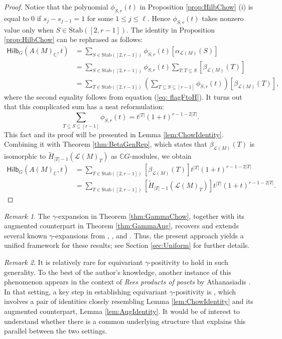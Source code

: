 \documentclass[reqno]{amsart}
\newcommand{\Stab}{{\mathrm{Stab}}}
\renewcommand{\L}{{\mathcal{L}}}
\newcommand{\Hilb}{{\mathsf{Hilb}}}
\theoremstyle{definition}
\theoremstyle{remark}
\newtheorem{rem}{Remark}[section]
\begin{document}
\begin{proof}
Notice that the polynomial $\phi_{S,r}(t)$ in Proposition \ref{prop:HilbChow} (i) is equal to $0$ if $s_j-s_{j-1}=1$ for some $1\le j\le \ell$.
Hence $\phi_{S,r}(t)$ takes nonzero value only when $S\in\Stab([2,r-1])$. 
The identity in Proposition \ref{prop:HilbChow} can be rephrased as follows:
\begin{align*}
    \Hilb_G(A(M)_{\mathbb{C}},t)
    &=\sum_{S\in \Stab([2,r-1])}\phi_{S,r}(t)[\alpha_{\L(M)}(S)]\\
    &=\sum_{S\in \Stab([2,r-1])}\phi_{S,r}(t)\sum_{T:T\subseteq S}[\beta_{\L(M)}(T)]\\
    &=\sum_{T\in\Stab([2,r-1])}\left(\sum_{T\subseteq S\subseteq [r-1]}\phi_{S,r}(t)\right)[\beta_{\L(M)}(T)],
\end{align*}
where the second equality follows from equation (\ref{eq: flagFtoH}). 
It turns out that this complicated sum has a neat reformulation:
\[
    \sum_{T\subseteq S\subseteq [r-1]}\phi_{S,r}(t)=t^{|T|}(1+t)^{r-1-2|T|}.
\]
This fact and its proof will be presented in Lemma \ref{lem:ChowIdentity}. Combining it with Theorem \ref{thm:BetaGenRep}, which states that $\beta_{\L(M)}(T)$ is isomorphic to $\tilde{H}_{|T|-1}(\L(M)_T)$ as $\mathbb{C}G$-modules, we obtain
\begin{align*}
    \Hilb_G(A(M)_{\mathbb{C}},t)
    &=\sum_{T\in\Stab([2,r-1])}[\beta_{\L(M)}(T)]t^{|T|}(1+t)^{r-1-2|T|}\\
    &=\sum_{T\in\Stab([2,r-1])}[\tilde{H}_{|T|-1}(\L(M)_T)]t^{|T|}(1+t)^{r-1-2|T|}.
\end{align*}
\end{proof}


\begin{rem}
The $\gamma$-expansion in Theorem \ref{thm:GammaChow}, together with its augmented counterpart in Theorem \ref{thm:GammaAug}, recovers and extends several known $\gamma$-expansions from \cite{ShareshianWachs2010}, \cite{ShareshianWachs2020}, and \cite{AthanasiadisGamma}.
Thus, the present approach yields a unified framework for these results; see Section \ref{sec:Uniform} for further details.
\end{rem}

\begin{rem}
It is relatively rare for equivariant $\gamma$-positivity to hold in such generality. To the best of the author's knowledge, another instance of this phenomenon appears in the context of \emph{Rees products of posets} by Athanasiadis  \cite{Athanasiadis2020EqGamma}.
In that setting, a key step in establishing equivariant $\gamma$-positivity is \cite[Lemma 3.1]{Athanasiadis2020EqGamma}, which involves a pair of identities closely resembling Lemma \ref{lem:ChowIdentity} and its augmented counterpart, Lemma \ref{lem:AugIdentity}.
It would be of interest to understand whether there is a common underlying structure that explains this parallel between the two settings.
\end{rem}
\end{document}
